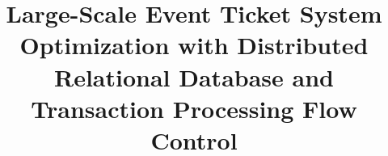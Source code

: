 \documentclass[conference,a4paper,english]{IEEEtran}
\begin{document}
\title{Large-Scale Event Ticket System Optimization with Distributed Relational Database and Transaction Processing Flow Control
}



\maketitle







\printbibliography
\end{document}

